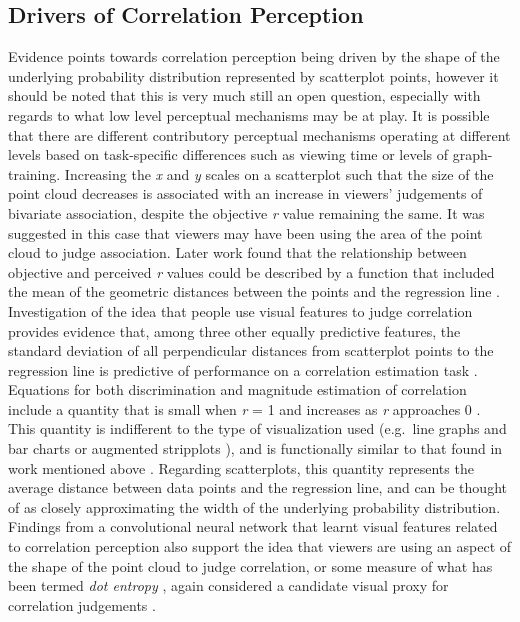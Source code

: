 \documentclass[sigconf]{acmart}
\begin{document}
\hypertarget{sec-drivers}{%
\subsection{Drivers of Correlation Perception}\label{sec-drivers}}

Evidence points towards correlation perception being driven by the shape
of the underlying probability distribution represented by scatterplot
points, however it should be noted that this is very much still an open
question, especially with regards to what low level perceptual
mechanisms may be at play. It is possible that there are different
contributory perceptual mechanisms operating at different levels based
on task-specific differences such as viewing time or levels of
graph-training. Increasing the \emph{x} and \emph{y} scales on a
scatterplot such that the size of the point cloud decreases
\citep{cleveland_1982} is associated with an increase in viewers'
judgements of bivariate association, despite the objective \emph{r}
value remaining the same. It was suggested in this case that viewers may
have been using the area of the point cloud to judge association. Later
work found that the relationship between objective and perceived
\emph{r} values could be described by a function that included the mean
of the geometric distances between the points and the regression line
\citep{meyer_1997}. Investigation of the idea that people use visual
features to judge correlation provides evidence that, among three other
equally predictive features, the standard deviation of all perpendicular
distances from scatterplot points to the regression line is predictive
of performance on a correlation estimation task \citep{yang_2019}.
Equations for both discrimination and magnitude estimation of
correlation include a quantity that is small when \emph{r} = 1 and
increases as \emph{r} approaches 0 \citep{rensink_2017}. This quantity
is indifferent to the type of visualization used (e.g.~line graphs and
bar charts \citep{harrison_2014} or augmented stripplots
\citep{rensink_2017}), and is functionally similar to that found in work
mentioned above \citep{cleveland_1982, meyer_1997, yang_2019}. Regarding
scatterplots, this quantity represents the average distance between data
points and the regression line, and can be thought of as closely
approximating the width of the underlying probability distribution.
Findings from a convolutional neural network that learnt visual features
related to correlation perception also support the idea that viewers are
using an aspect of the shape of the point cloud to judge correlation, or
some measure of what has been termed \emph{dot entropy}
\citep{yang_2023}, again considered a candidate visual proxy for
correlation judgements \citep{rensink_2017, rensink_2022}.
\end{document}
